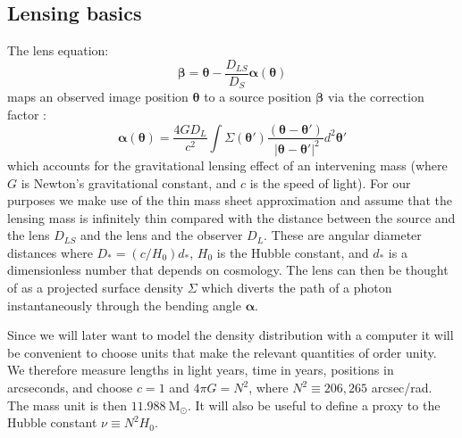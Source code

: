 \documentclass[galley,usenatbib]{mn2e}
\newcommand{\Msun}{\ensuremath{\mathrm{M}_\odot}}
\renewcommand{\vec}[1]{\ensuremath{\boldsymbol{#1}}}
\begin{document}
\subsection{Lensing basics}\label{sec:lensing_basic} %

The lens equation:
%
\begin{equation}
\vec\beta = \vec\theta - \frac{D_{LS}}{D_S}\vec\alpha(\vec\theta)
\label{eqn:lens_equation}
\end{equation}
%
maps an observed image position $\vec\theta$ to a source position $\vec\beta$
via the correction factor \citep[e.g.][]{1992grle.book.....S}:
%
\begin{equation}
\vec\alpha(\vec\theta) = \frac{4GD_L}{c^2} \int \Sigma(\vec\theta')\frac{(\vec\theta - \vec\theta')}{\ |\vec\theta - \vec\theta'|^2}d^2\vec\theta'
\end{equation}
%
which accounts for the gravitational lensing effect of an intervening mass
(where $G$ is Newton's gravitational constant, and $c$ is the speed of light).
For our purposes we make use of the thin mass sheet approximation and assume
that the lensing mass is infinitely thin compared with the distance between the
source and the lens $D_{LS}$ and the lens and the observer $D_{L}$. These are
angular diameter distances where $D_* = (c/H_0)d_*$, $H_0$ is the Hubble constant, and $d_*$ is a
dimensionless number that depends on cosmology.  The lens can then be thought
of as a projected surface density $\Sigma$ which diverts the path of a photon
instantaneously through the bending angle $\vec\alpha$.

Since we will later want to model the density distribution with a computer it
will be convenient to choose units that make the relevant quantities of order
unity.  We therefore measure lengths in light years, time in years, positions
in arcseconds, and choose $c=1$ and $4\pi G = N^2$, where $N^2 \equiv 206,265$
arcsec/rad. The mass unit is then $11.988\ \Msun$. It will also be useful to
define a proxy to the Hubble constant $\nu \equiv N^2 H_0$.
\end{document}
